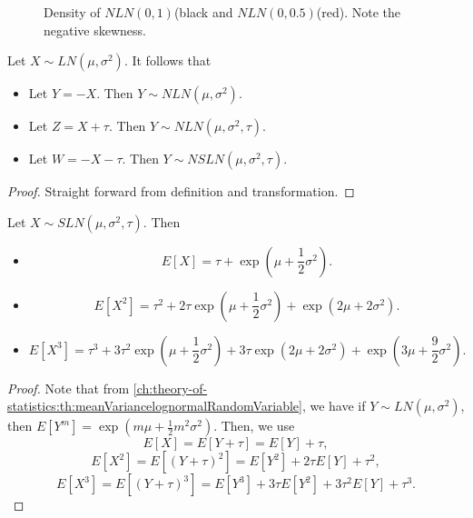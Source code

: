 \begin{refsection}
\begin{figure}[H]
	\centering
{}
	\caption{Density of $NLN(0,1)$(black and $NLN(0,0.5)$(red). Note the negative skewness.}
\end{figure}

\begin{lemma}
Let $X\sim LN(\mu,\sigma^2)$. It follows that
\begin{itemize}
	\item Let $Y = -X$. Then $Y\sim NLN(\mu, \sigma^2)$.
	\item Let $Z = X+\tau$. Then $Y\sim NLN(\mu, \sigma^2,\tau)$.
	\item Let $W = -X - \tau$. Then $Y\sim NSLN(\mu, \sigma^2, \tau)$.
\end{itemize}	
\end{lemma}
\begin{proof}
Straight forward from definition and transformation.
\end{proof}

\begin{lemma}\label{ch:theory-of-statistics:th:BasicPropertyShiftedlognormalRandomVariable}
Let $X\sim SLN(\mu,\sigma^2,\tau)$. Then
\begin{itemize}
	\item $$E[X] = \tau + \exp(\mu+\frac{1}{2}\sigma^2).$$
	\item $$E[X^2] = \tau^2 + 2\tau\exp(\mu+\frac{1}{2}\sigma^2)+\exp(2\mu+2\sigma^2).$$
	\item $$E[X^3] = \tau^3 + 3\tau^2\exp(\mu+\frac{1}{2}\sigma^2)+3\tau\exp(2\mu+2\sigma^2)+\exp(3\mu+\frac{9}{2}\sigma^2).$$
\end{itemize}	
\end{lemma}
\begin{proof}
Note that from \autoref{ch:theory-of-statistics:th:meanVariancelognormalRandomVariable}, we have
if $Y\sim LN(\mu,\sigma^2)$, then $E[Y^m] = \exp(m\mu + \frac{1}{2}m^2\sigma^2)$.
Then, we use
$$E[X] = E[Y+\tau] = E[Y] + \tau,$$
$$E[X^2] = E[(Y+\tau)^2] = E[Y^2] + 2\tau E[Y] + \tau^2,$$
$$E[X^3] = E[(Y+\tau)^3] = E[Y^3] + 3\tau E[Y^2] + 3\tau^2 E[Y] + \tau^3.$$


\end{proof}
\end{refsection}
